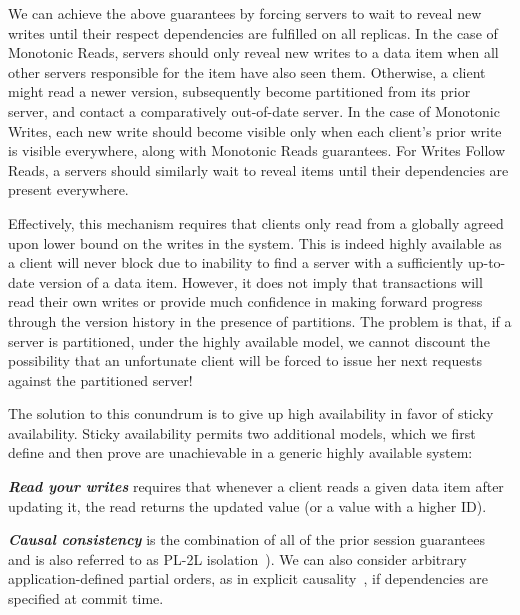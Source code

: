 We can achieve the above guarantees by forcing servers to wait to
reveal new writes until their respect dependencies are fulfilled on
all replicas. In the case of Monotonic Reads, servers should only
reveal new writes to a data item when all other servers responsible
for the item have also seen them. Otherwise, a client might read a
newer version, subsequently become partitioned from its prior server,
and contact a comparatively out-of-date server. In the case of
Monotonic Writes, each new write should become visible only when each
client's prior write is visible everywhere, along with Monotonic Reads
guarantees. For Writes Follow Reads, a servers should similarly wait
to reveal items until their dependencies are present
everywhere.

Effectively, this mechanism requires that clients only read from a
globally agreed upon lower bound on the writes in the system. This is
indeed highly available as a client will never block due to inability
to find a server with a sufficiently up-to-date version of a data
item. However, it does not imply that transactions will read their own
writes or provide much confidence in making forward progress through
the version history in the presence of partitions. The problem is
that, if a server is partitioned, under the highly available model, we
cannot discount the possibility that an unfortunate client will be
forced to issue her next requests against the partitioned server!

The solution to this conundrum is to give up high availability in
favor of sticky availability. Sticky availability permits two
additional models, which we first define and then prove are
unachievable in a generic highly available system:

\noindent\textit{\textbf{Read your writes}} requires
that whenever a client reads a given data item after updating it, the
read returns the updated value (or a value with a higher ID).

\vspace{.25em}\noindent\textit{\textbf{Causal consistency}} is the
combination of all of the prior session
guarantees~\cite{daudjee-session} and is also referred to as PL-2L
isolation~\cite{adya}). We can also consider arbitrary
application-defined partial orders, as in explicit
causality~\cite{explicit-socc}, if dependencies are specified at
commit time.

